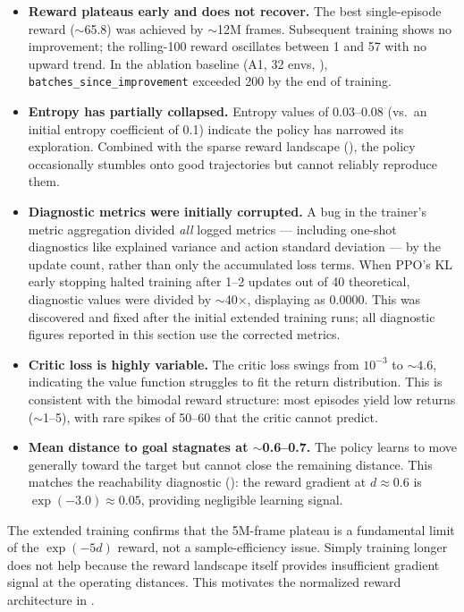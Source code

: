 \documentclass[11pt]{article}
\begin{document}
\begin{itemize}
  \item \textbf{Reward plateaus early and does not recover.}
  The best single-episode reward (${\sim}$65.8) was achieved by ${\sim}$12M frames.
  Subsequent training shows no improvement; the rolling-100 reward oscillates between 1 and 57 with no upward trend.
  In the ablation baseline (A1, 32 envs, ), \texttt{batches\_since\_improvement} exceeded 200 by the end of training.

  \item \textbf{Entropy has partially collapsed.}
  Entropy values of 0.03--0.08 (vs.\ an initial entropy coefficient of 0.1) indicate the policy has narrowed its exploration.
  Combined with the sparse reward landscape (), the policy occasionally stumbles onto good trajectories but cannot reliably reproduce them.

  \item \textbf{Diagnostic metrics were initially corrupted.}
  A bug in the trainer's metric aggregation divided \emph{all} logged metrics --- including one-shot diagnostics like explained variance and action standard deviation --- by the update count, rather than only the accumulated loss terms.
  When PPO's KL early stopping halted training after 1--2 updates out of 40 theoretical, diagnostic values were divided by ${\sim}$40$\times$, displaying as 0.0000.
  This was discovered and fixed after the initial extended training runs; all diagnostic figures reported in this section use the corrected metrics.

  \item \textbf{Critic loss is highly variable.}
  The critic loss swings from $10^{-3}$ to ${\sim}4.6$, indicating the value function struggles to fit the return distribution.
  This is consistent with the bimodal reward structure: most episodes yield low returns (${\sim}$1--5), with rare spikes of 50--60 that the critic cannot predict.

  \item \textbf{Mean distance to goal stagnates at ${\sim}$0.6--0.7.}
  The policy learns to move generally toward the target but cannot close the remaining distance.
  This matches the reachability diagnostic (): the reward gradient at $d \approx 0.6$ is $\exp(-3.0) \approx 0.05$, providing negligible learning signal.
\end{itemize}

\noindent
The extended training confirms that the 5M-frame plateau is a fundamental limit of the $\exp(-5d)$ reward, not a sample-efficiency issue.
Simply training longer does not help because the reward landscape itself provides insufficient gradient signal at the operating distances.
This motivates the normalized reward architecture in .
\end{document}
